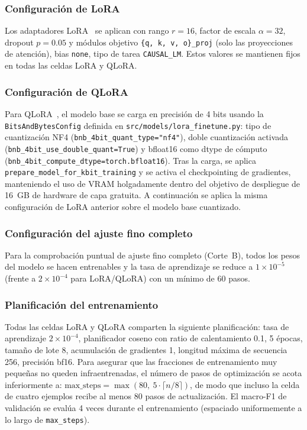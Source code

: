 \documentclass[conference]{IEEEtran}
\begin{document}
\subsubsection*{Configuración de LoRA}

Los adaptadores LoRA~\cite{hu2021lora} se aplican con rango $r=16$,
factor de escala $\alpha=32$, dropout $p=0.05$ y módulos objetivo
\texttt{\{q,\,k,\,v,\,o\}\_proj} (solo las proyecciones de atención),
bias \texttt{none}, tipo de tarea \texttt{CAUSAL\_LM}.
Estos valores se mantienen fijos en todas las celdas LoRA y QLoRA.

\subsubsection*{Configuración de QLoRA}

Para QLoRA~\cite{dettmers2023qlora}, el modelo base se carga en precisión de
4 bits usando la \texttt{BitsAndBytesConfig} definida en
\texttt{src/models/lora\_finetune.py}: tipo de cuantización NF4
(\texttt{bnb\_4bit\_quant\_type="nf4"}), doble cuantización activada
(\texttt{bnb\_4bit\_use\_double\_quant=True}) y bfloat16 como dtype de cómputo
(\texttt{bnb\_4bit\_compute\_dtype=torch.bfloat16}).
Tras la carga, se aplica \texttt{prepare\_\allowbreak model\_\allowbreak for\_\allowbreak kbit\_\allowbreak training} y se activa
el checkpointing de gradientes, manteniendo el uso de VRAM holgadamente dentro
del objetivo de despliegue de 16~GB de hardware de capa gratuita.
A continuación se aplica la misma configuración de LoRA anterior sobre el modelo
base cuantizado.

\subsubsection*{Configuración del ajuste fino completo}

Para la comprobación puntual de ajuste fino completo (Corte~B), todos los pesos
del modelo se hacen entrenables y la tasa de aprendizaje se reduce a
$1 \times 10^{-5}$ (frente a $2 \times 10^{-4}$ para LoRA/QLoRA) con un mínimo de
60 pasos.

\subsubsection*{Planificación del entrenamiento}

Todas las celdas LoRA y QLoRA comparten la siguiente planificación:
tasa de aprendizaje $2 \times 10^{-4}$, planificador coseno con ratio de
calentamiento 0.1, 5 épocas, tamaño de lote 8, acumulación de gradientes 1,
longitud máxima de secuencia 256, precisión bf16.
Para asegurar que las fracciones de entrenamiento muy pequeñas no queden
infraentrenadas, el número de pasos de optimización se acota inferiormente a:
$\text{max\_steps} = \max\!\left(80,\ 5 \cdot \lceil n / 8 \rceil\right)$,
de modo que incluso la celda de cuatro ejemplos recibe al menos 80 pasos de
actualización.
El macro-F1 de validación se evalúa 4 veces durante el entrenamiento (espaciado
uniformemente a lo largo de \texttt{max\_steps}).
\end{document}
